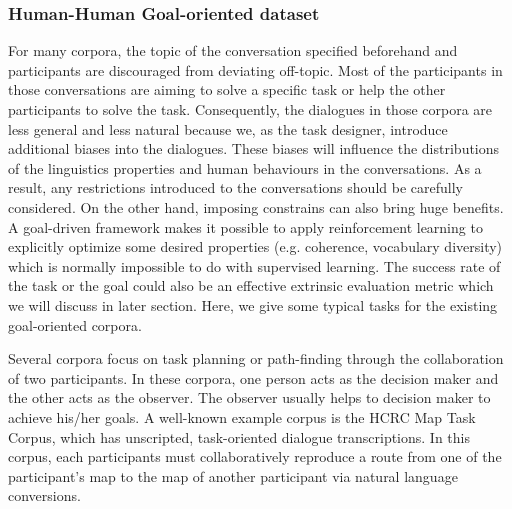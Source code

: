 \documentclass[bsc,frontabs,twoside,singlespacing,parskip,deptreport]{infthesis}     %
\begin{document}

\subsubsection{Human-Human Goal-oriented dataset}

For many corpora, the topic of the conversation specified beforehand and participants are discouraged from deviating off-topic. Most of the participants in those conversations are aiming to solve a specific task or help the other participants to solve the task. Consequently, the dialogues in those corpora are less general and less natural because we, as the task designer, introduce additional biases into the dialogues. These biases will influence the distributions of the linguistics properties and human behaviours in the conversations. As a result, any restrictions introduced to the conversations should be carefully considered. On the other hand, imposing constrains can also bring huge benefits. A goal-driven framework makes it possible to apply reinforcement learning to explicitly optimize some desired properties (e.g. coherence, vocabulary diversity) which is normally impossible to do with supervised learning\cite{jurafsky2019speech}. The success rate of the task or the goal could also be an effective extrinsic evaluation metric which we will discuss in later section. Here, we give some typical tasks for the existing goal-oriented corpora.

Several corpora focus on task planning or path-finding through the collaboration of two participants. In these corpora, one person acts as the decision maker and the other acts as the observer. The observer usually helps to decision maker to achieve his/her goals. A well-known example corpus is the HCRC Map Task Corpus\cite{anderson1991hcrc}, which has unscripted, task-oriented dialogue transcriptions. In this corpus, each participants must collaboratively reproduce a route from one of the participant’s map to the map of another participant via natural language conversions. 
\end{document}
